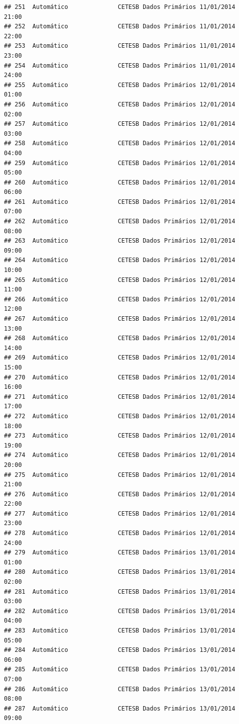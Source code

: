 \documentclass[]{book}
\begin{document}
\begin{verbatim}
## 251  Automático              CETESB Dados Primários 11/01/2014 21:00
## 252  Automático              CETESB Dados Primários 11/01/2014 22:00
## 253  Automático              CETESB Dados Primários 11/01/2014 23:00
## 254  Automático              CETESB Dados Primários 11/01/2014 24:00
## 255  Automático              CETESB Dados Primários 12/01/2014 01:00
## 256  Automático              CETESB Dados Primários 12/01/2014 02:00
## 257  Automático              CETESB Dados Primários 12/01/2014 03:00
## 258  Automático              CETESB Dados Primários 12/01/2014 04:00
## 259  Automático              CETESB Dados Primários 12/01/2014 05:00
## 260  Automático              CETESB Dados Primários 12/01/2014 06:00
## 261  Automático              CETESB Dados Primários 12/01/2014 07:00
## 262  Automático              CETESB Dados Primários 12/01/2014 08:00
## 263  Automático              CETESB Dados Primários 12/01/2014 09:00
## 264  Automático              CETESB Dados Primários 12/01/2014 10:00
## 265  Automático              CETESB Dados Primários 12/01/2014 11:00
## 266  Automático              CETESB Dados Primários 12/01/2014 12:00
## 267  Automático              CETESB Dados Primários 12/01/2014 13:00
## 268  Automático              CETESB Dados Primários 12/01/2014 14:00
## 269  Automático              CETESB Dados Primários 12/01/2014 15:00
## 270  Automático              CETESB Dados Primários 12/01/2014 16:00
## 271  Automático              CETESB Dados Primários 12/01/2014 17:00
## 272  Automático              CETESB Dados Primários 12/01/2014 18:00
## 273  Automático              CETESB Dados Primários 12/01/2014 19:00
## 274  Automático              CETESB Dados Primários 12/01/2014 20:00
## 275  Automático              CETESB Dados Primários 12/01/2014 21:00
## 276  Automático              CETESB Dados Primários 12/01/2014 22:00
## 277  Automático              CETESB Dados Primários 12/01/2014 23:00
## 278  Automático              CETESB Dados Primários 12/01/2014 24:00
## 279  Automático              CETESB Dados Primários 13/01/2014 01:00
## 280  Automático              CETESB Dados Primários 13/01/2014 02:00
## 281  Automático              CETESB Dados Primários 13/01/2014 03:00
## 282  Automático              CETESB Dados Primários 13/01/2014 04:00
## 283  Automático              CETESB Dados Primários 13/01/2014 05:00
## 284  Automático              CETESB Dados Primários 13/01/2014 06:00
## 285  Automático              CETESB Dados Primários 13/01/2014 07:00
## 286  Automático              CETESB Dados Primários 13/01/2014 08:00
## 287  Automático              CETESB Dados Primários 13/01/2014 09:00

\end{verbatim}
\end{document}
